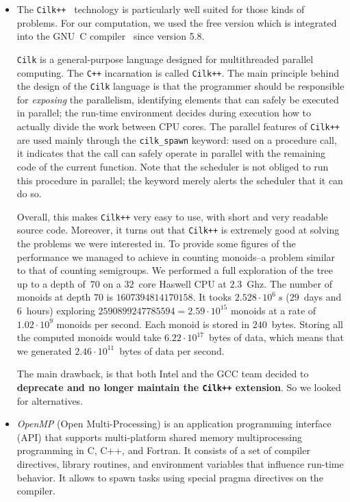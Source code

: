 \documentclass{deliverablereport}
\newcommand{\Cilk}{\texttt{Cilk}\xspace}
\newcommand{\CilkP}{\texttt{Cilk++}\xspace}
\newcommand{\CPP}{\texttt{C++}\xspace}
\begin{document}
\begin{itemize}
\item The \CilkP~\cite{CilkIntel} technology is particularly well suited for
  those kinds of problems. For our computation, we used the free version which
  is integrated into the GNU~C compiler~\cite{GCCcilk} since version 5.8.

  \Cilk is a general-purpose language designed for multithreaded parallel
  computing. The \CPP incarnation is called \CilkP. The main principle
  behind the design of the \Cilk language is that the programmer should be
  responsible for \emph{exposing} the parallelism, identifying elements that
  can safely be executed in parallel; the run-time environment decides during
  execution how to actually divide the work between CPU cores. The parallel
  features of \CilkP are used mainly through the \texttt{cilk\_spawn} keyword:
  used on a procedure call, it indicates that the call can safely operate in
  parallel with the remaining code of the current function. Note that the
  scheduler is not obliged to run this procedure in parallel; the keyword
  merely alerts the scheduler that it can do so.

  Overall, this makes \CilkP very easy to use, with short and very readable
  source code. Moreover, it turns out that \CilkP is extremely good at solving
  the problems we were interested in. To provide some figures of the performance we managed
  to achieve in counting monoids--a problem similar to that of counting
  semigroups. We performed a full exploration of the tree up to a depth of~$70$ on
  a $32$~core Haswell CPU at $2.3$~Ghz. The number of monoids at depth $70$ is
  $1607394814170158$.  It tooks $2.528\cdot10^{6}~s$ ($29$~days and $6$~hours)
  exploring $2590899247785594=2.59\cdot10^{15}$ monoids at a rate of
  $1.02\cdot10^{9}$ monoids per second. Each monoid is stored in
  $240$~bytes. Storing all the computed monoids would take
  $6.22\cdot10^{17}$~bytes of data, which means that we generated
  $2.46\cdot10^{11}$~bytes of data per second.

  The main drawback, is that both Intel and the GCC team decided
  to \textbf{deprecate and no longer maintain the \CilkP extension}. So we
  looked for alternatives.


\item \emph{OpenMP} (Open Multi-Processing) is an application programming
  interface (API) that supports multi-platform shared memory multiprocessing
  programming in C, C++, and Fortran. It consists of a set of compiler
  directives, library routines, and environment variables that influence
  run-time behavior. It allows to spawn tasks using special pragma directives on the
  compiler.


\end{itemize}
\end{document}
